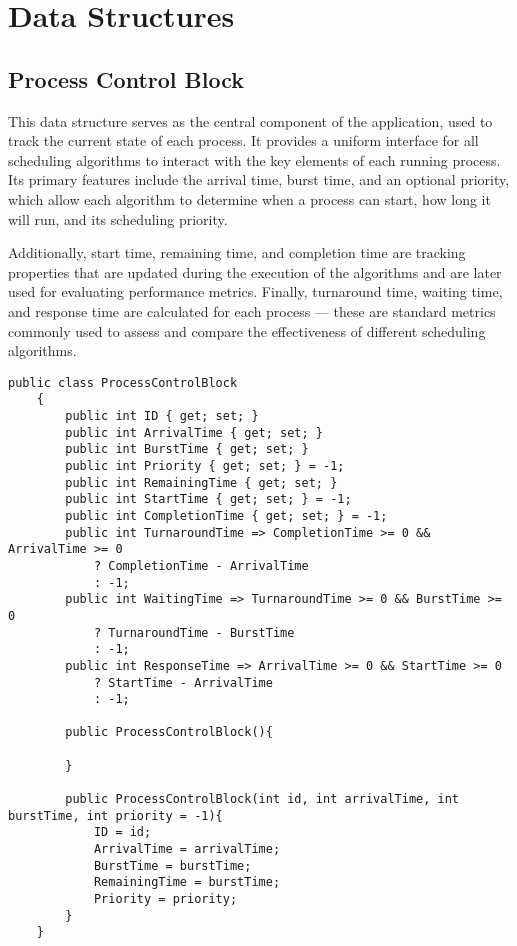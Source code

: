 \documentclass[conference]{report}
\begin{document}
\section*{Data Structures}

\subsection*{Process Control Block}
This data structure serves as the central component of the application, used to track the current state of each process. It provides a uniform interface for all scheduling algorithms to interact with the key elements of each running process. Its primary features include the arrival time, burst time, and an optional priority, which allow each algorithm to determine when a process can start, how long it will run, and its scheduling priority.

Additionally, start time, remaining time, and completion time are tracking properties that are updated during the execution of the algorithms and are later used for evaluating performance metrics. Finally, turnaround time, waiting time, and response time are calculated for each process — these are standard metrics commonly used to assess and compare the effectiveness of different scheduling algorithms.

\hfill
\begin{lstlisting}[caption={Process Control Block Definition}]
    public class ProcessControlBlock
    {
        public int ID { get; set; }
        public int ArrivalTime { get; set; }
        public int BurstTime { get; set; }
        public int Priority { get; set; } = -1;
        public int RemainingTime { get; set; }
        public int StartTime { get; set; } = -1;
        public int CompletionTime { get; set; } = -1;
        public int TurnaroundTime => CompletionTime >= 0 && ArrivalTime >= 0
            ? CompletionTime - ArrivalTime
            : -1;
        public int WaitingTime => TurnaroundTime >= 0 && BurstTime >= 0
            ? TurnaroundTime - BurstTime
            : -1;
        public int ResponseTime => ArrivalTime >= 0 && StartTime >= 0 
            ? StartTime - ArrivalTime 
            : -1;
    
        public ProcessControlBlock(){
        
        }
    
        public ProcessControlBlock(int id, int arrivalTime, int burstTime, int priority = -1){
            ID = id;
            ArrivalTime = arrivalTime;
            BurstTime = burstTime;
            RemainingTime = burstTime;
            Priority = priority;
        }
    }
\end{lstlisting}
\end{document}
